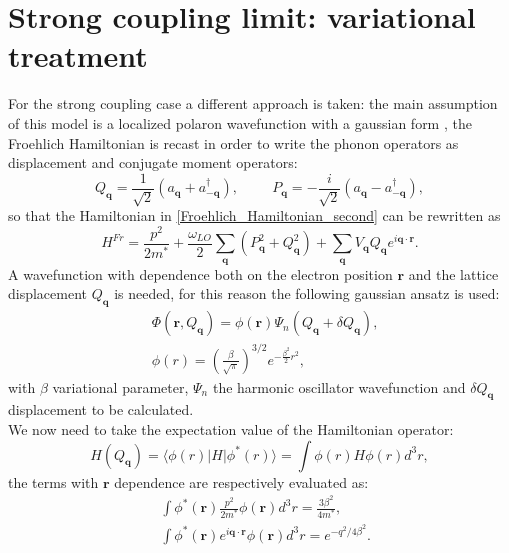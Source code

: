 \documentclass[12pt, a4paper]{report}
\numberwithin{equation}{section}
\begin{document}
\section{Strong coupling limit: variational treatment}
For the strong coupling case a different approach is taken: the main assumption of this model is a localized polaron wavefunction with 
a gaussian form \cite{mahan2013many}, the Froehlich Hamiltonian is recast in order to write the phonon operators as displacement and 
conjugate moment operators:
\begin{equation}
    Q_\mathbf{q}=\frac{1}{\sqrt{2}}\left(a_\mathbf{q}+a^\dagger_{-\mathbf{q}}\right),\hspace{1cm}P_\mathbf{q}=-\frac{i}{\sqrt{2}}\left(a_\mathbf{q}-a^\dagger_{-\mathbf{q}}\right),
\end{equation}
so that the Hamiltonian in \ref{Froehlich_Hamiltonian_second} can be rewritten as
\begin{equation}
    H^{Fr}=\frac{p^2}{2m^*}+\frac{\omega_{LO}}{2}\sum_{\mathbf{q}}\left(P^2_\mathbf{q}+Q^2_\mathbf{q}\right)+\sum_\mathbf{q}V_\mathbf{q}Q_\mathbf{q}e^{i\mathbf{q}\cdot\mathbf{r}}.
\end{equation}
A wavefunction with dependence both on the electron position $\mathbf{r}$ and the lattice displacement $Q_\mathbf{q}$ is needed, for 
this reason the following gaussian ansatz is used:
\begin{equation}
\begin{split}
    &\Phi(\mathbf{r},Q_\mathbf{q})=\phi(\mathbf{r})\Psi_n(Q_\mathbf{q}+\delta Q_\mathbf{q}),\\
    &\phi(r)=\left(\frac{\beta}{\sqrt{\pi}}\right)^{3/2}e^{-\frac{\beta^2}{2}r^2},
\end{split}
\end{equation}
with $\beta$ variational parameter, $\Psi_n$ the harmonic oscillator wavefunction and $\delta Q_\mathbf{q}$ displacement to be 
calculated.\\
We now need to take the expectation value of the Hamiltonian operator:
\begin{equation}
    H(Q_\mathbf{q})=\langle \phi(r)|H|\phi^*(r)\rangle=\int \phi(r)H\phi(r)d^3r,
\end{equation}
the terms with $\mathbf{r}$ dependence are respectively evaluated as:
\begin{equation}
\begin{split}
    &\int\phi^*(\mathbf{r})\frac{p^2}{2m^*}\phi(\mathbf{r})d^3r=\frac{3\beta^2}{4m^*},\\
    &\int \phi^*(\mathbf{r})e^{i\mathbf{q}\cdot\mathbf{r}}\phi(\mathbf{r})d^3r=e^{-q^2/4\beta^2}.
\end{split}
\end{equation}
\end{document}
